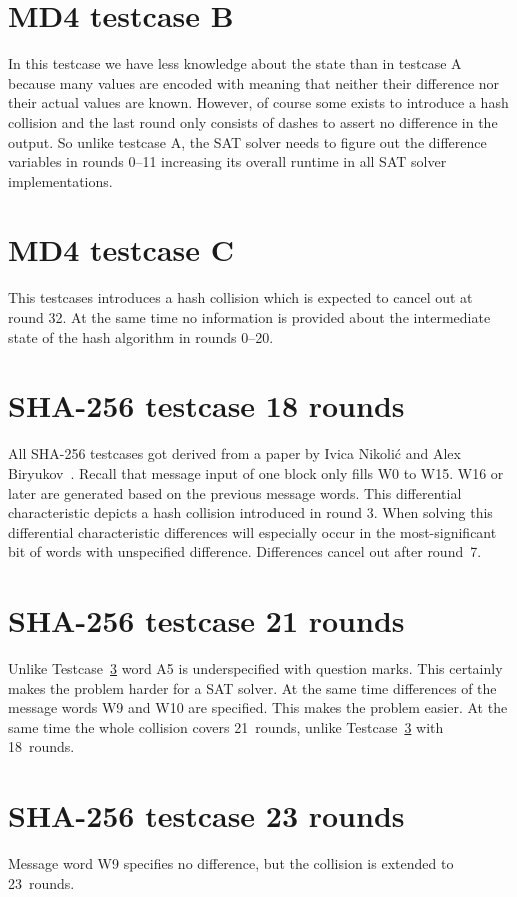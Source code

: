 \begin{appendices}
\section{MD4 testcase B}
\label{sec:tcB}
In this testcase we have less knowledge about the state than in testcase A
because many values are encoded with {\dnCq} meaning that neither their
difference nor their actual values are known.
However, of course some {\dnCx} exists to introduce a hash collision
and the last round only consists of dashes to assert no difference
in the output.
So unlike testcase A, the SAT solver needs to figure out the difference
variables in rounds 0--11 increasing its overall runtime in all SAT solver
implementations.

\section{MD4 testcase C}
\label{sec:tcC}
This testcases introduces a hash collision which is expected to cancel out
at round 32. At the same time no information is provided about the intermediate
state of the hash algorithm in rounds 0--20.

\section{SHA-256 testcase 18 rounds}
\label{sec:tc18}
All SHA-256 testcases got derived from a paper by Ivica Nikolić and Alex Biryukov~\cite{nikolic2008collisions}.
Recall that message input of one block only fills W0 to W15. W16 or later
are generated based on the previous message words. This differential characteristic
depicts a hash collision introduced in round 3. When solving this differential characteristic
differences will especially occur in the most-significant bit of words with unspecified
difference. Differences cancel out after round~7.

\section{SHA-256 testcase 21 rounds}
\label{sec:tc21}
Unlike Testcase~\ref{sec:tc18} word A5 is underspecified with question marks.
This certainly makes the problem harder for a SAT solver.
At the same time differences of the message words W9 and W10 are specified.
This makes the problem easier. At the same time the whole collision covers
21~rounds, unlike Testcase~\ref{sec:tc18} with 18~rounds.

\section{SHA-256 testcase 23 rounds}
\label{sec:tc23}
Message word W9 specifies no difference, but the collision is extended
to 23~rounds.


\end{appendices}
